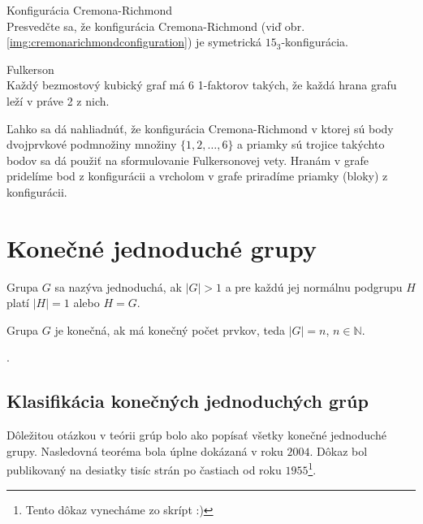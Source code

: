 
\begin{exercise}{Konfigurácia Cremona-Richmond}\\
	\label{ex:cremonarichmond153}
	Presvedčte sa, že konfigurácia Cremona-Richmond (viď obr. \ref{img:cremonarichmondconfiguration}) je symetrická $15_3$-konfigurácia. 
\end{exercise}

\begin{hypothesis} {Fulkerson}\\
	Každý bezmostový kubický graf má 6 1-faktorov takých, že každá hrana grafu leží v práve 2 z nich.
\end{hypothesis}

Ľahko sa dá nahliadnúť, že konfigurácia Cremona-Richmond v ktorej sú body dvojprvkové podmnožiny množiny $\{1, 2, \dots, 6\}$ a priamky sú trojice takýchto bodov sa dá použiť na sformulovanie Fulkersonovej vety. Hranám v grafe pridelíme bod z konfigurácii a vrcholom v grafe priradíme priamky (bloky) z konfigurácii.

\section{Konečné jednoduché grupy}

\begin{definition}
	Grupa $G$ sa nazýva jednoduchá, ak $\lvert G\rvert > 1$ a pre každú jej normálnu podgrupu $H$ platí $\lvert H \rvert = 1$ alebo $H = G$.
\end{definition}

\begin{definition}
Grupa $G$ je konečná, ak má konečný počet prvkov, teda $\lvert G \rvert = n$, $n \in \mathbb{N}$.
\end{definition}.

\subsection{Klasifikácia konečných jednoduchých grúp}

Dôležitou otázkou v teórii grúp bolo ako popísať všetky konečné jednoduché grupy. Nasledovná teoréma bola úplne dokázaná v roku $2004$. Dôkaz bol publikovaný na desiatky tisíc strán po častiach od roku $1955$\footnote{Tento dôkaz vynecháme zo skrípt :)}.

